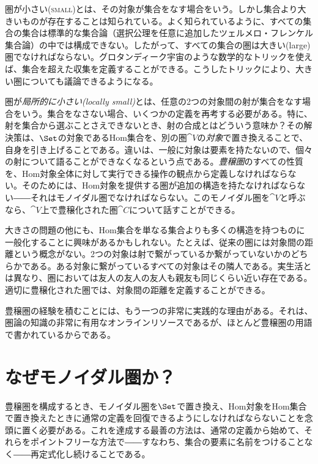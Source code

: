 
\lettrine[lhang=0.17]{圏}{が小さい(small)とは}、その対象が集合をなす場合をいう。しかし集合より大きいものが存在することは知られている。よく知られているように、すべての集合の集合は標準的な集合論（選択公理を任意に追加したツェルメロ・フレンケル集合論）の中では構成できない。したがって、すべての集合の圏は大きい(large)圏でなければならない。グロタンディーク宇宙のような数学的なトリックを使えば、集合を超えた収集を定義することができる。こうしたトリックにより、大きい圏についても議論できるようになる。

圏が\emph{局所的に小さい(locally small)}とは、任意の2つの対象間の射が集合をなす場合をいう。集合をなさない場合、いくつかの定義を再考する必要がある。特に、射を集合から選ぶことさえできないとき、射の合成とはどういう意味か？その解決策は、$\Set$の対象であるHom集合を、別の圏$\cat{V}$の\emph{対象}で置き換えることで、自身を引き上げることである。違いは、一般に対象は要素を持たないので、個々の射について語ることができなくなるという点である。\emph{豊穣圏}のすべての性質を、Hom対象全体に対して実行できる操作の観点から定義しなければならない。そのためには、Hom対象を提供する圏が追加の構造を持たなければならない――それはモノイダル圏でなければならない。このモノイダル圏を$\cat{V}$と呼ぶなら、$\cat{V}$上で豊穣化された圏$\cat{C}$について話すことができる。

大きさの問題の他にも、Hom集合を単なる集合よりも多くの構造を持つものに一般化することに興味があるかもしれない。たとえば、従来の圏には対象間の距離という概念がない。2つの対象は射で繋がっているか繋がっていないかのどちらかである。ある対象に繋がっているすべての対象はその隣人である。実生活とは異なり、圏においては友人の友人の友人も親友も同じくらい近い存在である。適切に豊穣化された圏では、対象間の距離を定義することができる。

豊穣圏の経験を積むことには、もう一つの非常に実践的な理由がある。それは、圏論の知識の非常に有用なオンラインリソースであるが、ほとんど豊穣圏の用語で書かれているからである。

\section{なぜモノイダル圏か？}

豊穣圏を構成するとき、モノイダル圏を$\Set$で置き換え、Hom対象をHom集合で置き換えたときに通常の定義を回復できるようにしなければならないことを念頭に置く必要がある。これを達成する最善の方法は、通常の定義から始めて、それらをポイントフリーな方法で――すなわち、集合の要素に名前をつけることなく――再定式化し続けることである。

